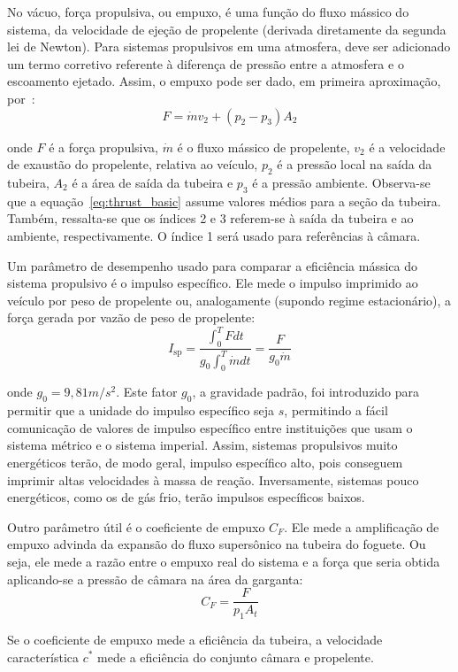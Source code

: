 No vácuo, força propulsiva, ou empuxo, é uma função do fluxo mássico do sistema, da velocidade de ejeção de propelente (derivada diretamente da segunda lei de Newton). Para sistemas propulsivos em uma atmosfera, deve ser adicionado um termo corretivo referente à diferença de pressão entre a atmosfera e o escoamento ejetado. Assim, o empuxo pode ser dado, em primeira aproximação, por~\cite{Sutton}:
\begin{equation}
    \label{eq:thrust_basic}
    F = \dot{m} v_2 + (p_2 - p_3) A_2
\end{equation}

onde \(F\) é a força propulsiva, \(\dot{m}\) é o fluxo mássico de propelente, \(v_2\) é a velocidade de exaustão do propelente, relativa ao veículo, \(p_2\) é a pressão local na saída da tubeira, \(A_2\) é a área de saída da tubeira e \(p_3\) é a pressão ambiente. Observa-se que a equação~\ref{eq:thrust_basic} assume valores médios para a seção da tubeira. Também, ressalta-se que os índices 2 e 3 referem-se à saída da tubeira e ao ambiente, respectivamente. O índice 1 será usado para referências à câmara.

Um parâmetro de desempenho usado para comparar a eficiência mássica do sistema propulsivo é o impulso específico. Ele mede o impulso imprimido ao veículo por peso de propelente ou, analogamente (supondo regime estacionário), a força gerada por vazão de peso de propelente:
\begin{equation}
    \label{eq:Isp}
    I_{\text{sp}} = \frac{\int^T_0 F dt}{g_0 \int^T_0 \dot{m}dt} = \frac{F}{g_0 \dot{m}}
\end{equation}

onde \(g_0=9,81m/s^2\). Este fator \(g_0\), a gravidade padrão, foi introduzido para permitir que a unidade do impulso específico seja \(s\), permitindo a fácil comunicação de valores de impulso específico entre instituições que usam o sistema métrico e o sistema imperial. Assim, sistemas propulsivos muito energéticos terão, de modo geral, impulso específico alto, pois conseguem imprimir altas velocidades à massa de reação. Inversamente, sistemas pouco energéticos, como os de gás frio, terão impulsos específicos baixos.

Outro parâmetro útil é o coeficiente de empuxo \(C_F\). Ele mede a amplificação de empuxo advinda da expansão do fluxo supersônico na tubeira do foguete. Ou seja, ele mede a razão entre o empuxo real do sistema e a força que seria obtida aplicando-se a pressão de câmara na área da garganta:
\begin{equation}
    \label{eq:C_F}
    C_F = \frac{F}{p_1 A_t}
\end{equation}

Se o coeficiente de empuxo mede a eficiência da tubeira, a velocidade característica \(c^*\) mede a eficiência do conjunto câmara e propelente. 